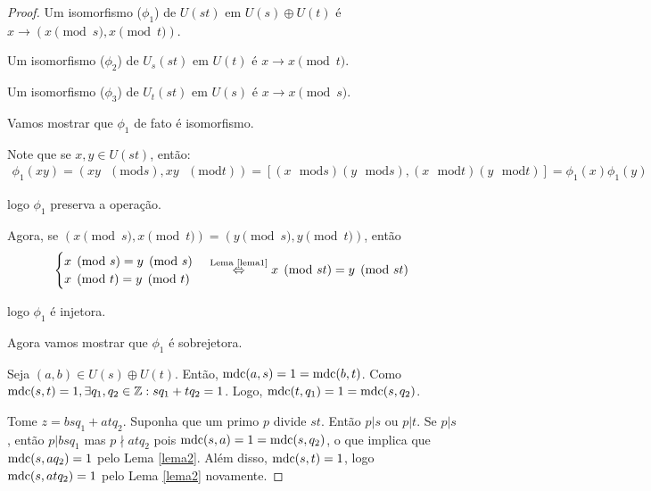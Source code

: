 	\begin{proof}
		Um isomorfismo ($\phi_1$) de $U(st)$ em $U(s)\oplus U(t)$ é $x\to (x\pmod s, x\pmod t)$.
		\par\vspace{0.3cm} Um isomorfismo ($\phi_2$) de $U_s(st)$ em $U(t)$ é $x\to x\pmod t$.
		\par\vspace{0.3cm} Um isomorfismo ($\phi_3$) de $U_t(st)$ em $U(s)$ é $x\to x\pmod s$.
		\par\vspace{0.3cm} Vamos mostrar que $\phi_1$ de fato é isomorfismo.
		\vspace{0.3cm}\par Note que se $x, y \in U(st)$, então: \begin{align*} \phi_1(xy) = (xy\text{ }(\mathrm{mod} s), xy\text{ }(\mathrm{mod} t)) = [(x\text{ }\mathrm{mod} s)(y\text{ }\mathrm{mod} s), (x\text{ }\mathrm{mod} t)(y\text{ }\mathrm{mod} t)] = \phi_1(x)\phi_1(y)
		\end{align*} 
		\par\vspace{0.3cm}logo $\phi_1$ preserva a operação.
		\par\vspace{0.3cm} Agora, se $(x\pmod s, x\pmod t) = (y\pmod s, y\pmod t)$, então 
		\begin{align*}
		\begin{cases}
		x\pmod s = y\pmod s \\ x\pmod t = y\pmod t
		\end{cases} \overset{\text{Lema \eqref{lema1}}}{\Leftrightarrow } x\pmod {st} = y\pmod {st} 
		\end{align*}
		\par\vspace{0.3cm}logo $\phi_1$ é injetora.
		\par\vspace{0.3cm} Agora vamos mostrar que $\phi_1$ é sobrejetora.
		\par\vspace{0.3cm} Seja $(a,b)\in U(s)\oplus U(t)$. Então, $\operatorname{mdc}(a,s) = 1 = \operatorname{mdc}(b,t)$. Como $\operatorname{mdc}(s,t) = 1, \exists q_1, q_2\in \mathbb{Z}: sq_1 + tq_2 = 1$. Logo, $\operatorname{mdc}(t,q_1) = 1 = \operatorname{mdc}(s,q_2)$. 
		\par\vspace{0.3cm} Tome $z = bsq_1 + atq_2$. Suponha que um primo $p$ divide $st$. Então $p|s$ ou $p|t$. Se $p|s$, então $p|bsq_1$ mas $p\nmid atq_2$ pois $\operatorname{mdc}(s,a) = 1 = \operatorname{mdc}(s,q_2)$, o que implica que $\operatorname{mdc}(s,aq_2) = 1$ pelo Lema \eqref{lema2}. Além disso, $\operatorname{mdc}(s,t) = 1$, logo $\operatorname{mdc}(s,atq_2) = 1$ pelo Lema \eqref{lema2} novamente.

\end{proof}
